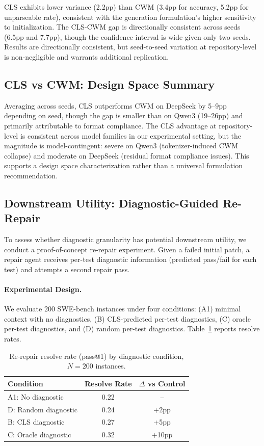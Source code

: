 \documentclass[11pt]{article}
\begin{document}
CLS exhibits lower variance (2.2pp) than CWM (3.4pp for accuracy, 5.2pp for unparseable rate), consistent with the generation formulation's higher sensitivity to initialization. The CLS-CWM gap is directionally consistent across seeds (6.5pp and 7.7pp), though the confidence interval is wide given only two seeds. Results are directionally consistent, but seed-to-seed variation at repository-level is non-negligible and warrants additional replication.

\subsection{CLS vs CWM: Design Space Summary}

Averaging across seeds, CLS outperforms CWM on DeepSeek by 5--9pp depending on seed, though the gap is smaller than on Qwen3 (19--26pp) and primarily attributable to format compliance. The CLS advantage at repository-level is consistent across model families in our experimental setting, but the magnitude is model-contingent: severe on Qwen3 (tokenizer-induced CWM collapse) and moderate on DeepSeek (residual format compliance issues). This supports a design space characterization rather than a universal formulation recommendation.

\subsection{Downstream Utility: Diagnostic-Guided Re-Repair}
\label{sec:rerepair}

To assess whether diagnostic granularity has potential downstream utility, we conduct a proof-of-concept re-repair experiment. Given a failed initial patch, a repair agent receives per-test diagnostic information (predicted pass/fail for each test) and attempts a second repair pass.

\paragraph{Experimental Design.}
We evaluate 200 SWE-bench instances under four conditions: (A1) minimal context with no diagnostics, (B) CLS-predicted per-test diagnostics, (C) oracle per-test diagnostics, and (D) random per-test diagnostics. Table~\ref{tab:rerepair-200} reports resolve rates.

\begin{table}[t]
\centering
\caption{Re-repair resolve rate (pass@1) by diagnostic condition, $N=200$ instances.}
\label{tab:rerepair-200}
\begin{tabular}{lcc}
\toprule
Condition & Resolve Rate & $\Delta$ vs Control \\
\midrule
A1: No diagnostic & 0.22 & -- \\
D: Random diagnostic & 0.24 & +2pp \\
B: CLS diagnostic & 0.27 & +5pp \\
C: Oracle diagnostic & 0.32 & +10pp \\
\bottomrule
\end{tabular}
\end{table}
\end{document}
